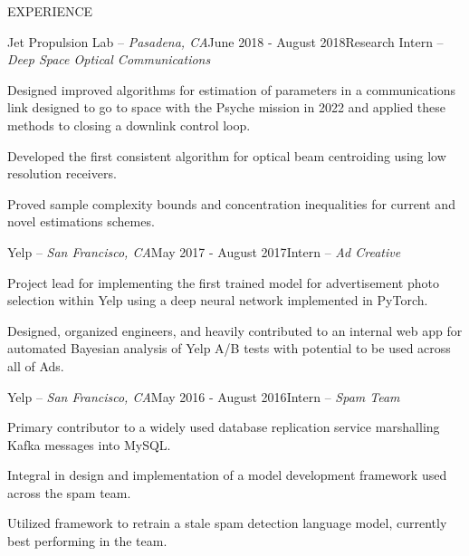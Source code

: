 \documentclass{resume} %
\begin{document}
 

\vspace{-1em}
\begin{rSection}{EXPERIENCE}

\begin{rSubsection}{Jet Propulsion Lab -- {\it Pasadena, CA}}{June 2018 - August 2018}{Research Intern -- {\sl Deep Space Optical Communications}}

\item Designed improved algorithms for estimation of parameters in a communications link designed
    to go to space with the Psyche mission in 2022 and applied these methods to closing a downlink
    control loop.
\item Developed the first consistent algorithm for optical beam centroiding using low resolution receivers.
\item Proved sample complexity bounds and concentration inequalities for current and novel estimations schemes.
\end{rSubsection}

\begin{rSubsection}{Yelp -- {\it San Francisco, CA}}{May 2017 - August 2017}{Intern -- {\sl Ad Creative}}

\item Project lead for implementing the first trained model for advertisement photo selection
    within Yelp using a deep neural network implemented in PyTorch.
\item Designed, organized engineers, and heavily contributed to an internal web app for
    automated Bayesian analysis of Yelp A/B tests with potential to be used across all of Ads.
\end{rSubsection}

\begin{rSubsection}{Yelp -- {\it San Francisco, CA}}{May 2016 - August 2016}{Intern -- {\sl Spam Team}}

\item Primary contributor to a widely used database replication service marshalling Kafka messages into MySQL.
\item Integral in design and implementation of a model development framework used across the spam team.
\item Utilized framework to retrain a stale spam detection language model, currently best performing in
    the team.
\end{rSubsection}


\end{rSection}
\end{document}
